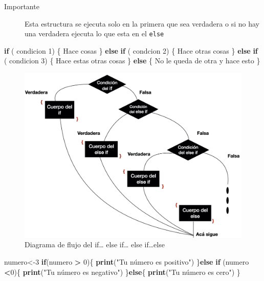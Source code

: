 \documentclass[
]{book}
\newenvironment{Shaded}{\begin{snugshade}}{\end{snugshade}}
\newcommand{\ControlFlowTok}[1]{\textcolor[rgb]{0.13,0.29,0.53}{\textbf{#1}}}
\newcommand{\DecValTok}[1]{\textcolor[rgb]{0.00,0.00,0.81}{#1}}
\newcommand{\FunctionTok}[1]{\textcolor[rgb]{0.13,0.29,0.53}{\textbf{#1}}}
\newcommand{\NormalTok}[1]{#1}
\newcommand{\OtherTok}[1]{\textcolor[rgb]{0.56,0.35,0.01}{#1}}
\newcommand{\SpecialCharTok}[1]{\textcolor[rgb]{0.81,0.36,0.00}{\textbf{#1}}}
\newcommand{\StringTok}[1]{\textcolor[rgb]{0.31,0.60,0.02}{#1}}
\begin{document}
\begin{description}
\item[Importante]
Esta estructura se ejecuta solo en la primera que sea verdadera o si no hay una verdadera ejecuta lo que esta en el \texttt{else}
\end{description}

\begin{Shaded}
\begin{Highlighting}[]
\ControlFlowTok{if}\NormalTok{ ( condicion }\DecValTok{1}\NormalTok{) \{}
\NormalTok{Hace cosas}
\NormalTok{\} }\ControlFlowTok{else} \ControlFlowTok{if}\NormalTok{ ( condcion }\DecValTok{2}\NormalTok{) \{}
\NormalTok{Hace otras cosas}
\NormalTok{\} }\ControlFlowTok{else} \ControlFlowTok{if}\NormalTok{ ( condicion }\DecValTok{3}\NormalTok{) \{}
\NormalTok{Hace estas otras cosas}
\NormalTok{\} }\ControlFlowTok{else}\NormalTok{ \{}
\NormalTok{No le queda de otra y hace esto}
\NormalTok{\}}
\end{Highlighting}
\end{Shaded}

\begin{figure}
\hypertarget{id}{%
\centering
\includegraphics[width=1\textwidth,height=1.5\textheight]{If_else_else_if.001.jpeg}
\caption{Diagrama de flujo del if\ldots{} else if\ldots{} else if\ldots else}\label{id}
}
\end{figure}

\begin{Shaded}
\begin{Highlighting}[]
\NormalTok{numero}\OtherTok{\textless{}{-}}\DecValTok{3}
\ControlFlowTok{if}\NormalTok{(numero }\SpecialCharTok{\textgreater{}} \DecValTok{0}\NormalTok{)\{}
  \FunctionTok{print}\NormalTok{(}\StringTok{"Tu número es positivo"}\NormalTok{)}
\NormalTok{\}}\ControlFlowTok{else} \ControlFlowTok{if}\NormalTok{ (numero }\SpecialCharTok{\textless{}}\DecValTok{0}\NormalTok{)\{}
  \FunctionTok{print}\NormalTok{(}\StringTok{"Tu número es negativo"}\NormalTok{)}
\NormalTok{\}}\ControlFlowTok{else}\NormalTok{\{}
  \FunctionTok{print}\NormalTok{(}\StringTok{"Tu número es cero"}\NormalTok{)}
\NormalTok{\}}
\end{Highlighting}
\end{Shaded}
\end{document}
